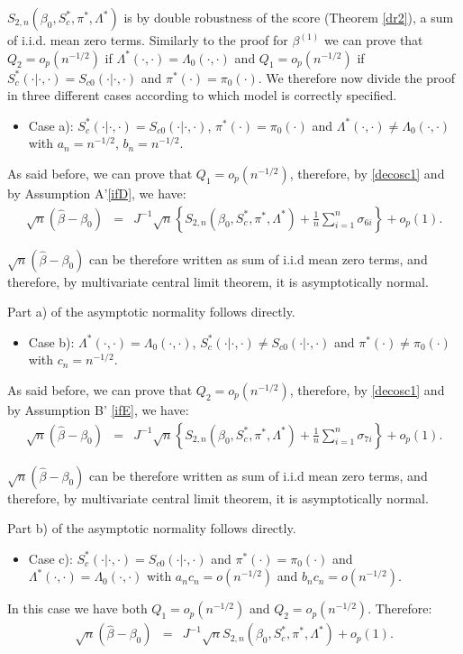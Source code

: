 \documentclass[11pt]{article}
\newcommand{\ee}{\end{eqnarray}}
\newcommand{\eqnn}{\begin{eqnarray*}}
\newcommand{\een}{\end{eqnarray*}}
\newcommand{\be}{\begin{eqnarray}}
\begin{document}
$S_{2,n}(\beta_0, S^{*}_{c},  \pi^{*}, \Lambda^{*})$ is by double robustness of the score  (Theorem \ref{dr2}), a sum of i.i.d. mean zero terms.
Similarly to the proof for $\beta^{(1)}$
we can prove that $Q_2=o_p(n^{-1/2})$ if $\Lambda^{*}(\cdot,\cdot)=\Lambda_0(\cdot,\cdot)$ and $Q_1=o_p(n^{-1/2})$ if $S_c^{*}(\cdot | \cdot,\cdot)=S_{c0}(\cdot | \cdot,\cdot)$ and $\pi^{*}(\cdot)=\pi_0(\cdot)$.
We therefore now divide the proof in three different cases according to which model is correctly specified.

\begin{itemize}
\item{ Case a): $S^{*}_c(\cdot | \cdot,\cdot)=S_{c0}(\cdot | \cdot,\cdot)$, $\pi^{*}(\cdot)=\pi_0(\cdot)$ and $\Lambda^{*}(\cdot,\cdot)\neq \Lambda_0(\cdot,\cdot)$ with $a_n=n^{-1/2}$, $b_n=n^{-1/2}$.}
\end{itemize}
As said before, we can prove that $Q_1=o_p(n^{-1/2})$, therefore, by \eqref{decosc1} and by Assumption A'\ref{ifD}, we have:
\eqnn
\sqrt{n}(\hat \beta-\beta_0)&=&J^{-1}\sqrt{n}\left\{S_{2,n}(\beta_0, S^{*}_{c},  \pi^{*}, \Lambda^{*})+\frac{1}{n}\sum_{i=1}^n\sigma_{6i}\right\}+o_p(1).
\een

$\sqrt{n}(\hat \beta-\beta_0)$ can be therefore written as  sum of i.i.d mean zero terms, and therefore, by multivariate central limit theorem, it is asymptotically normal.

Part a) of the asymptotic normality follows directly.

\begin{itemize}
\item{Case b): $\Lambda^{*}(\cdot,\cdot)=\Lambda_{0}(\cdot,\cdot)$, $S_c^{*}(\cdot | \cdot,\cdot)\neq S_{c0}(\cdot|\cdot,\cdot)$ and $\pi^{*}(\cdot)\neq \pi_0(\cdot)$ with $c_n=n^{-1/2}$.}
\end{itemize}
As said before, we can prove that $Q_2=o_p(n^{-1/2})$, therefore, by \eqref{decosc1} and by Assumption B' \ref{ifE}, we have:
\eqnn
\sqrt{n}(\hat \beta-\beta_0)&=&J^{-1}\sqrt{n}\left\{S_{2,n}(\beta_0, S^{*}_{c},  \pi^{*}, \Lambda^{*})+\frac{1}{n}\sum_{i=1}^n\sigma_{7i}\right\}+o_p(1).
\een

$\sqrt{n}(\hat \beta-\beta_0)$ can be therefore written as sum of i.i.d mean zero terms, and therefore, by multivariate central limit theorem, it is asymptotically normal.

Part b) of the asymptotic normality follows directly.

\begin{itemize}
\item{Case c): $S^{*}_c(\cdot | \cdot,\cdot)=S_{c0}(\cdot | \cdot,\cdot)$ and $\pi^{*}(\cdot)=\pi_0(\cdot)$ and $\Lambda^{*}(\cdot,\cdot)=\Lambda_{0}(\cdot,\cdot)$ with $a_nc_n=o(n^{-1/2})$ and $b_nc_n=o(n^{-1/2})$.}
\end{itemize}
In this case we have both $Q_1=o_p(n^{-1/2})$ and $Q_2=o_p(n^{-1/2})$. Therefore:
\be\label{decosc1c}
\sqrt{n}(\hat \beta-\beta_0)&=&J^{-1}\sqrt{n}S_{2,n}(\beta_0, S^{*}_{c},  \pi^{*}, \Lambda^{*})+o_p(1).
\ee
\end{document}
